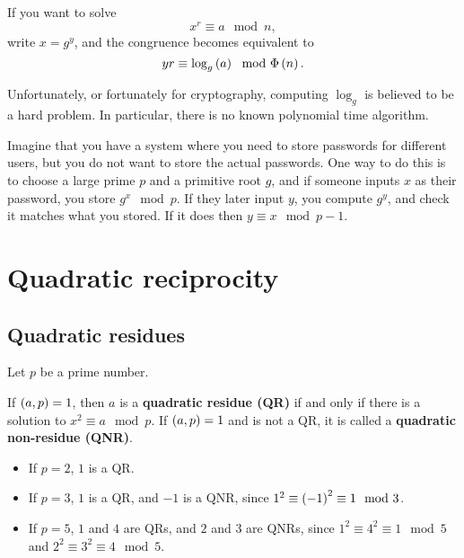 \begin{example*}
If you want to solve
$$ x^r \equiv a \mod n, $$
write $ x = g^y $, and the congruence becomes equivalent to
$$ yr \equiv \log_g\br{a} \mod \Phi\br{n}. $$
\end{example*}

Unfortunately, or fortunately for cryptography, computing $ \log_g $ is believed to be a hard problem. In particular, there is no known polynomial time algorithm.

\begin{example*}
Imagine that you have a system where you need to store passwords for different users, but you do not want to store the actual passwords. One way to do this is to choose a large prime $ p $ and a primitive root $ g $, and if someone inputs $ x $ as their password, you store $ g^x \mod p $. If they later input $ y $, you compute $ g^y $, and check it matches what you stored. If it does then $ y \equiv x \mod p - 1 $.
\end{example*}

\pagebreak

\section{Quadratic reciprocity}

\subsection{Quadratic residues}

Let $ p $ be a prime number.

\begin{definition}
If $ \br{a, p} = 1 $, then $ a $ is a \textbf{quadratic residue (QR)} if and only if there is a solution to $ x^2 \equiv a \mod p $. If $ \br{a, p} = 1 $ and is not a QR, it is called a \textbf{quadratic non-residue (QNR)}.
\end{definition}

\begin{example*}
\hfill
\begin{itemize}
\item If $ p = 2 $, $ 1 $ is a QR.
\item If $ p = 3 $, $ 1 $ is a QR, and $ -1 $ is a QNR, since $ 1^2 \equiv \br{-1}^2 \equiv 1 \mod 3 $.
\item If $ p = 5 $, $ 1 $ and $ 4 $ are QRs, and $ 2 $ and $ 3 $ are QNRs, since $ 1^2 \equiv 4^2 \equiv 1 \mod 5 $ and $ 2^2 \equiv 3^2 \equiv 4 \mod 5 $.
\end{itemize}
\end{example*}

